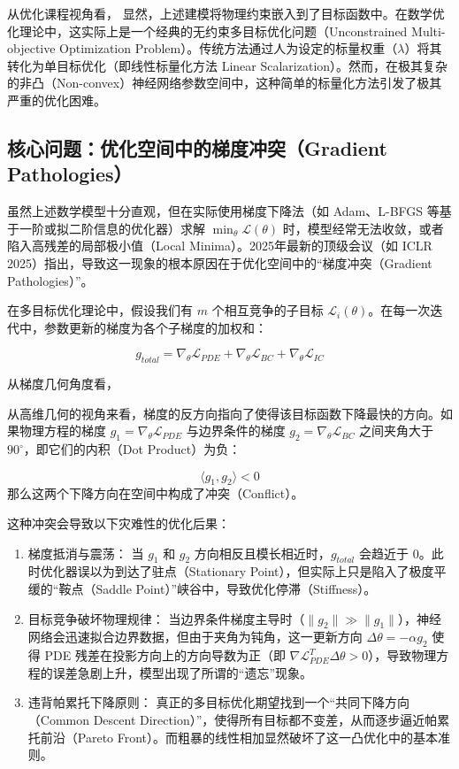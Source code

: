 \documentclass[UTF8,a4paper,12pt,fontset=none]{ctexart}
\begin{document}
从优化课程视角看， 显然，上述建模将物理约束嵌入到了目标函数中。在数学优化理论中，这实际上是一个经典的无约束多目标优化问题（Unconstrained Multi-objective Optimization Problem）。传统方法通过人为设定的标量权重（$\lambda$）将其转化为单目标优化（即线性标量化方法 Linear Scalarization）。然而，在极其复杂的非凸（Non-convex）神经网络参数空间中，这种简单的标量化方法引发了极其严重的优化困难。


\subsection{核心问题：优化空间中的梯度冲突（Gradient Pathologies）}

虽然上述数学模型十分直观，但在实际使用梯度下降法（如 Adam、L-BFGS 等基于一阶或拟二阶信息的优化器）求解 $\min_\theta \mathcal{L}(\theta)$ 时，模型经常无法收敛，或者陷入高残差的局部极小值（Local Minima）。2025年最新的顶级会议（如 ICLR 2025）指出，导致这一现象的根本原因在于优化空间中的“梯度冲突（Gradient Pathologies）”。


在多目标优化理论中，假设我们有 $m$ 个相互竞争的子目标 $\mathcal{L}_i(\theta)$。在每一次迭代中，参数更新的梯度为各个子梯度的加权和：

\[
g_{total} = \nabla_\theta \mathcal{L}_{PDE} + \nabla_\theta \mathcal{L}_{BC} + \nabla_\theta \mathcal{L}_{IC}
\]

从梯度几何角度看，

从高维几何的视角来看，梯度的反方向指向了使得该目标函数下降最快的方向。如果物理方程的梯度 $g_1 = \nabla_\theta \mathcal{L}_{PDE}$ 与边界条件的梯度 $g_2 = \nabla_\theta \mathcal{L}_{BC}$ 之间夹角大于 $90^\circ$，即它们的内积（Dot Product）为负：

\[
\langle g_1, g_2 \rangle < 0
\]
那么这两个下降方向在空间中构成了冲突（Conflict）。


这种冲突会导致以下灾难性的优化后果：

\begin{enumerate}
\item 梯度抵消与震荡： 当 $g_1$ 和 $g_2$ 方向相反且模长相近时，$g_{total}$ 会趋近于 0。此时优化器误以为到达了驻点（Stationary Point），但实际上只是陷入了极度平缓的“鞍点（Saddle Point）”峡谷中，导致优化停滞（Stiffness）。
\item 目标竞争破坏物理规律： 当边界条件梯度主导时（$\|g_2\| \gg \|g_1\|$），神经网络会迅速拟合边界数据，但由于夹角为钝角，这一更新方向 $\Delta \theta = -\alpha g_2$ 使得 PDE 残差在投影方向上的方向导数为正（即 $\nabla \mathcal{L}_{PDE}^T \Delta \theta > 0$），导致物理方程的误差急剧上升，模型出现了所谓的“遗忘”现象。
\item 违背帕累托下降原则： 真正的多目标优化期望找到一个“共同下降方向（Common Descent Direction）”，使得所有目标都不变差，从而逐步逼近帕累托前沿（Pareto Front）。而粗暴的线性相加显然破坏了这一凸优化中的基本准则。
\end{enumerate}
\end{document}
